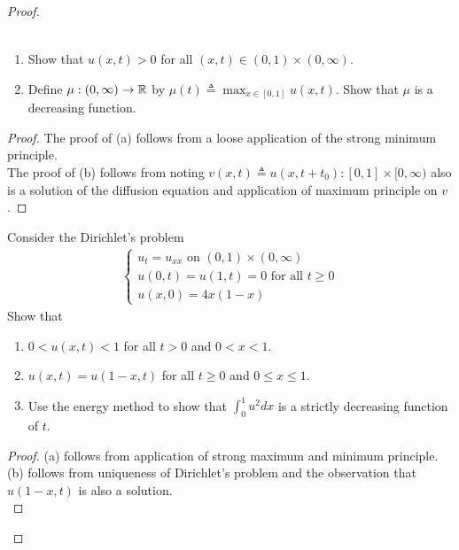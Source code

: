 \documentclass{report}
\begin{document}
\begin{proof}
\begin{question}{}{}
\begin{align*}
\end{align*}
\begin{enumerate}[label=(\alph*)]
  \item Show that $u(x,t)>0$ for all $(x,t)\in (0,1)\times (0,\infty)$. 
  \item Define $\mu : (0,\infty)\rightarrow \mathbb{R}$ by $\mu(t)\triangleq \max_{x\in [0,1]} u(x,t)$. Show that $\mu$ is a decreasing function. 
\end{enumerate}
\end{question}
\begin{proof}
The proof of (a) follows from a loose application of the strong minimum principle. \\

The proof of (b) follows from noting $v(x,t)\triangleq u(x,t+t_0):[0,1]\times [0,\infty)$ also is a solution of the diffusion equation and application of maximum principle on $v$.
\end{proof}
\begin{question}{}{}
Consider the Dirichlet's problem 
\begin{align*}
\begin{cases}  
u_t=u_{xx}\text{ on }(0,1)\times (0,\infty)\\
u(0,t)=u(1,t)=0 \text{ for all }t\geq 0\\
u(x,0)=4x(1-x)
\end{cases}
\end{align*}
Show that 
\begin{enumerate}[label=(\alph*)]
  \item $0<u(x,t)<1$ for all $t>0$ and  $0<x<1$.  
  \item $u(x,t)=u(1-x,t)$ for all $t\geq 0$ and $0\leq x\leq 1$. 
  \item Use the energy method to show that $\int_0^1 u^2dx$ is a strictly decreasing function of $t$.
\end{enumerate}
\end{question}
\begin{proof}
  (a) follows from application of strong maximum and minimum principle. (b) follows from uniqueness of Dirichlet's problem and the observation that $u(1-x,t)$ is also a solution. \\


\end{proof}
\end{proof}
\end{document}
